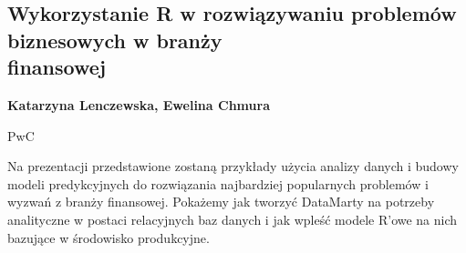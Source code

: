 \documentclass[\main/boa.tex]{subfiles}
\begin{document}
\subsection{Wykorzystanie R w rozwiązywaniu problemów biznesowych w branży \\finansowej}

\begin{minipage}{0.915\textwidth}
	\centering
  {\bf {} Katarzyna Lenczewska,  Ewelina Chmura}
\end{minipage}


\begin{affiliations}
\begin{minipage}{0.915\textwidth}
\centering
PwC \\[-2pt]
\end{minipage}
\end{affiliations}

\vskip 0.3cm

  Na prezentacji przedstawione zostaną przykłady użycia analizy danych i budowy modeli predykcyjnych do rozwiązania najbardziej popularnych problemów i wyzwań z branży finansowej. Pokażemy jak tworzyć DataMarty na potrzeby analityczne w postaci relacyjnych baz danych i jak wpleść modele R'owe na nich bazujące w środowisko produkcyjne. 
\end{document}

